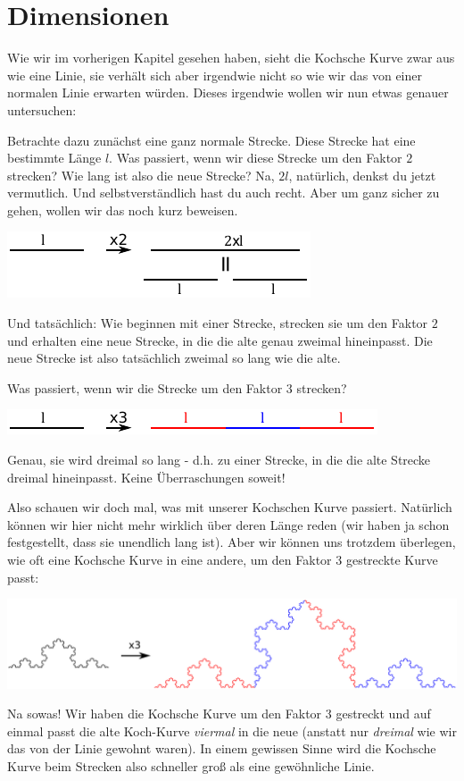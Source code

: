 \documentclass[a4paper,ngerman,12pt]{scrartcl}
\theoremstyle{definition}
\theoremstyle{plain}
\theoremstyle{remark}
\begin{document}
\section{Dimensionen}

Wie wir im vorherigen Kapitel gesehen haben, sieht die Kochsche Kurve zwar aus wie eine Linie, sie verhält sich aber irgendwie nicht so wie wir das von einer normalen Linie erwarten würden. Dieses \glqq irgendwie\grqq{} wollen wir nun etwas genauer untersuchen:

Betrachte dazu zunächst eine ganz normale Strecke. Diese Strecke hat eine bestimmte Länge $l$. Was passiert, wenn wir diese Strecke um den Faktor $2$ strecken? Wie lang ist also die neue Strecke? Na, $2l$, natürlich, denkst du jetzt vermutlich. Und selbstverständlich hast du auch recht. Aber um ganz sicher zu gehen, wollen wir das noch kurz beweisen.

\begin{center}
	\includegraphics[width=.5\textwidth]{Bilder/Linie_vergroessern.pdf}
\end{center}

Und tatsächlich: Wie beginnen mit einer Strecke, strecken sie um den Faktor $2$ und erhalten eine neue Strecke, in die die alte genau zweimal hineinpasst. Die neue Strecke ist also tatsächlich zweimal so lang wie die alte.

Was passiert, wenn wir die Strecke um den Faktor $3$ strecken?
\begin{center}
	\includegraphics[width=.7\textwidth]{Bilder/Linie_vergroessern2.pdf}
\end{center}
Genau, sie wird dreimal so lang - d.h. zu einer Strecke, in die die alte Strecke dreimal hineinpasst. Keine Überraschungen soweit!

Also schauen wir doch mal, was mit unserer Kochschen Kurve passiert. Natürlich können wir hier nicht mehr wirklich über deren Länge reden (wir haben ja schon festgestellt, dass sie unendlich lang ist). Aber wir können uns trotzdem überlegen, wie oft eine Kochsche Kurve in eine andere, um den Faktor $3$ gestreckte Kurve passt:
\begin{center}
	\includegraphics[width=.7\textwidth]{Bilder/KochKurve_vergroessern.pdf}
\end{center}
Na sowas! Wir haben die Kochsche Kurve um den Faktor $3$ gestreckt und auf einmal passt die alte Koch-Kurve \emph{viermal} in die neue (anstatt nur \emph{dreimal} wie wir das von der Linie gewohnt waren). In einem gewissen Sinne wird die Kochsche Kurve beim Strecken also \glqq schneller groß\grqq{} als eine gewöhnliche Linie.
\end{document}
